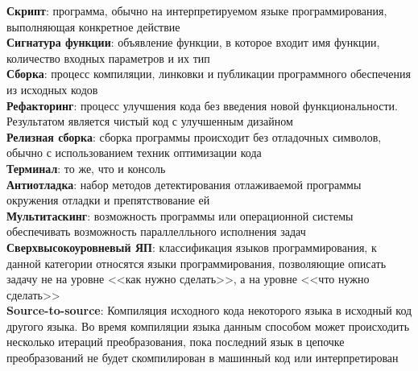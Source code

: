 \textbf{Скрипт}: программа, обычно на интерпретируемом языке программирования, выполняющая конкретное действие                                \\
\textbf{Сигнатура функции}: объявление функции, в которое входит имя функции, количество входных параметров и их тип                          \\
\textbf{Сборка}: процесс компиляции, линковки и публикации программного обеспечения из исходных кодов                                         \\
\textbf{Рефакторинг}: процесс улучшения кода без введения новой функциональности. Результатом является чистый код с улучшенным дизайном       \\
\textbf{Релизная сборка}: сборка программы происходит без отладочных символов, обычно с использованием техник оптимизации кода                \\
\textbf{Терминал}: то же, что и консоль                                                                                                       \\
\textbf{Антиотладка}: набор методов детектирования отлаживаемой программы окружения отладки и препятствование ей                              \\
\textbf{Мультитаскинг}: возможность программы или операционной системы обеспечивать возможность параллелльного исполнения задач               \\
\textbf{Сверхвысокоуровневый ЯП}: классификация языков программирования, к данной категории относятся языки программирования,
позволяющие описать задачу не на уровне <<как нужно сделать>>, а на уровне <<что нужно сделать>>                                              \\
\textbf{Source-to-source}: Компиляция исходного кода некоторого языка в исходный код другого языка. Во время компиляции языка данным способом
 может происходить несколько итераций преобразования, пока последний язык в цепочке преобразований не будет скомпилирован в машинный код или интерпретирован\\
